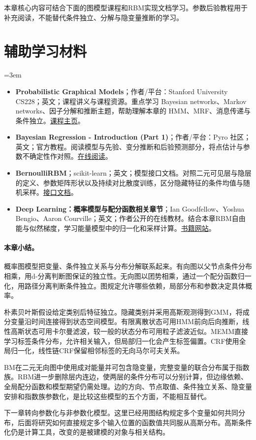 本章核心内容可结合下面的图模型课程和RBM实现文档学习。参数后验教程用于补充阅读，不能替代条件独立、分解与隐变量推断的学习。
\section*{辅助学习材料}
\begingroup
\emergencystretch=3em
\begin{itemize}
\item \textbf{Probabilistic Graphical Models}；作者/平台：Stanford University CS228；英文；课程讲义与课程资源。重点学习 Bayesian networks、Markov networks、因子分解和推断主题，帮助理解本章的 HMM、MRF、消息传递与条件独立。\href{https://ermongroup.github.io/cs228/}{课程主页}。
\item \textbf{Bayesian Regression - Introduction (Part 1)}；作者/平台：Pyro 社区；英文；官方教程。阅读模型与先验、变分推断和后验预测部分，将点估计与参数不确定性作对照。\href{https://pyro.ai/examples/bayesian\_regression.html}{在线阅读}。
\item \textbf{BernoulliRBM}；scikit-learn；英文；模型接口文档。对照二元可见层与隐层的定义、参数矩阵形状以及持续对比散度训练，区分隐藏特征的条件均值与随机采样。\href{https://scikit-learn.org/stable/modules/generated/sklearn.neural\_network.BernoulliRBM.html}{接口文档}。
\item \textbf{Deep Learning：概率模型与配分函数相关章节}；Ian Goodfellow、Yoshua Bengio、Aaron Courville；英文；作者公开的在线教材。结合本章RBM自由能与似然梯度，学习能量模型中的归一化和采样计算。\href{https://www.deeplearningbook.org/}{书籍网站}。
\end{itemize}
\endgroup
\paragraph{本章小结。}
概率图模型把变量、条件独立关系与分布分解联系起来。有向图以父节点条件分布相乘，用d-分离判断图保证的独立性。无向图以团势相乘，通过一个配分函数归一化，用路径分离判断条件独立。图规定允许哪些依赖，局部分布和参数决定具体概率。

朴素贝叶斯假设给定类别后特征独立。隐藏类别并采用高斯观测得到GMM，将成分变量沿时间连接得到状态空间模型。有限离散状态可用HMM前向后向推断，线性高斯状态可用卡尔曼滤波，较一般的状态分布可用粒子滤波近似。MEMM直接学习标签条件分布，允许相关输入，但局部归一化会产生标签偏置。CRF使用全局归一化，线性链CRF保留相邻标签的无向马尔可夫关系。

BM在二元无向图中使用成对能量并可包含隐变量，完整变量的联合分布属于指数族。RBM进一步删除层内连边，使两层的条件分布可以分别计算，但边缘依赖、全局配分函数和模型期望仍需处理。边的方向、节点取值、条件独立关系、隐变量安排和指数族参数化，是比较这些模型的五个方面，不能相互替代。

下一章转向参数化与非参数化模型。这里已经用图结构规定多个变量如何共同分布，后面将研究如何直接规定多个输入位置的函数值共同服从高斯分布。高斯条件化仍是计算工具，改变的是被建模的对象与相关结构。
